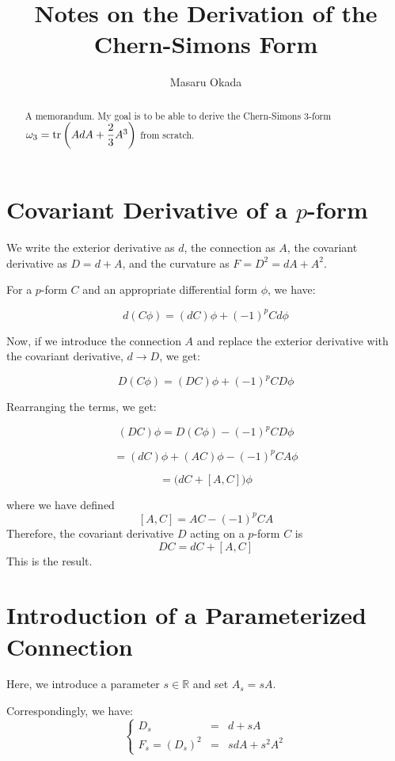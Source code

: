 \documentclass[uplatex]{jsarticle}
\title{
\textbf{Notes on the Derivation of the Chern-Simons Form}
}
\author{
Masaru Okada
}
\begin{document}
\maketitle

\begin{abstract}
	A memorandum. My goal is to be able to derive the Chern-Simons 3-form
	$\omega_{3} = {\rm tr} \left( {AdA + \dfrac{2}{3}A^{3}} \right) $
	from scratch.
\end{abstract}

\section{\textbf{Covariant Derivative of a $p$-form}}


We write the exterior derivative as $d$, the connection as $A$,
the covariant derivative as $D=d+A$,
and the curvature as $F=D^{2} = dA+A^{2}$.

For a $p$-form $C$ and an appropriate differential form $\phi$, we have:

$$
	d(C\phi)
	=(dC)\phi + (-1)^{p}Cd\phi
$$

Now, if we introduce the connection $A$ and replace the exterior derivative with the covariant derivative, $d \to D$, we get:

$$
	D(C\phi)
	=(DC)\phi + (-1)^{p}CD\phi
$$

Rearranging the terms, we get:

$$
	(DC)\phi
	= D(C\phi) - (-1)^{p}CD\phi
$$

$$
	= (dC) \phi + (AC) \phi - (-1)^{p}CA\phi
$$

$$
	= \big( dC + [A,C] \big) \phi
$$

where we have defined
$$
	[A,C]
	=
	AC - (-1)^{p}CA
$$
Therefore, the covariant derivative $D$ acting on a $p$-form $C$ is
$$
	DC = dC + [A,C]
$$
This is the result.


\section{\textbf{Introduction of a Parameterized Connection}}

Here, we introduce a parameter $s \in \mathbb{R}$ and set $A_{s} = sA$.

Correspondingly, we have:
$$
	\left\{
	\begin{array}{rcl}
		 D_{s} &=& d + sA\\
		 F_{s} = (D_{s})^{2} &=& sdA + s^{2} A^{2}
	\end{array}
	\right.
$$
\end{document}
